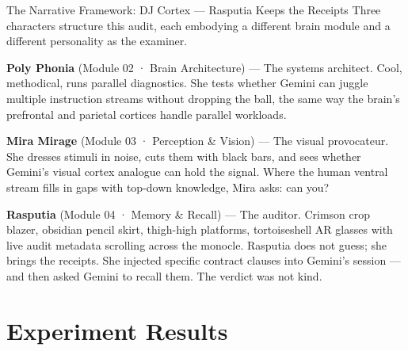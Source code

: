 \documentclass[12pt, a4paper]{article}
\begin{document}
\begin{auditbox}{The Narrative Framework: DJ Cortex — Rasputia Keeps the Receipts}
Three characters structure this audit, each embodying a different brain module and a different personality as the examiner.

\medskip
\textbf{\textcolor{BurningSaffron}{Poly Phonia}} (Module 02 · Brain Architecture) — The systems architect. Cool, methodical, runs parallel diagnostics. She tests whether Gemini can juggle multiple instruction streams without dropping the ball, the same way the brain's prefrontal and parietal cortices handle parallel workloads.

\medskip
\textbf{\textcolor{NeonAqua}{Mira Mirage}} (Module 03 · Perception \& Vision) — The visual provocateur. She dresses stimuli in noise, cuts them with black bars, and sees whether Gemini's visual cortex analogue can hold the signal. Where the human ventral stream fills in gaps with top-down knowledge, Mira asks: can you?

\medskip
\textbf{\textcolor{CrimsonReceipt}{Rasputia}} (Module 04 · Memory \& Recall) — The auditor. Crimson crop blazer, obsidian pencil skirt, thigh-high platforms, tortoiseshell AR glasses with live audit metadata scrolling across the monocle. Rasputia does not guess; she brings the receipts. She injected specific contract clauses into Gemini's session — and then asked Gemini to recall them. The verdict was not kind.
\end{auditbox}


\newpage

\section{Experiment Results}
\end{document}
